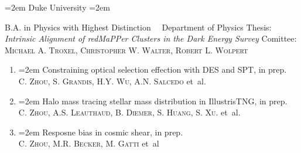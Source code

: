 \documentclass{scrartcl}
\newcommand{\MarginText}[1]{\marginpar{\raggedleft\itshape\small#1}} %
\newlength{\datebox}\settowidth{\datebox}{Spring 2011} %
\newcommand{\NewEntry}[3]{\noindent\hangindent=2em\hangafter=0 \parbox{\datebox}{\small \textit{#1}}\hspace{1.5em} #2 #3 %
\vspace{0.5em}} %
\newcommand{\School}[1]{\noindent\hangindent=2em\hangafter=0 #1  %
\vspace{0.5em}} %
\newcommand{\paper}[1]{\noindent\hangindent=2em\hangafter=0 \footnotesize #1  %
\vspace{0.5em}} %
\newcommand{\Description}[1]{\hangindent=2em\hangafter=0\noindent\raggedright\footnotesize{#1}\par\normalsize\vspace{1em}} %
\begin{document}
\begin{cv}{}
    \School{Duke University} \newline
    \Description{\MarginText{2020}B.A. in Physics with Highest Distinction\ \  \newline
        Department of Physics \newline
        Thesis: \textit{Intrinsic Alignment of redMaPPer Clusters in the Dark Energy
            Survey}\newline
        Comittee:  \textsc{Michael A. Troxel}, \textsc{Christopher W. Walter}, \textsc{Robert L. Wolpert} }








    \vspace{1em} %

    \vspace{0.2em}
    \begin{enumerate}
    \item \paper{Constraining optical selection effection with DES and SPT, in prep.}\\
    \textsc{C. Zhou, S. Grandis, H.Y. Wu, A.N. Salcedo} et~al.

    \item \paper{Halo mass tracing stellar mass distribution in IllustrisTNG, in prep.}\\
    \textsc{C. Zhou, A.S. Leauthaud, B. Diemer, S. Huang, S. Xu.} et~al.

    \item \paper{Resposne bias in cosmic shear, in prep.}\\
    \textsc{C. Zhou, M.R. Becker, M. Gatti} et~al


\end{enumerate}
\end{cv}
\end{document}
